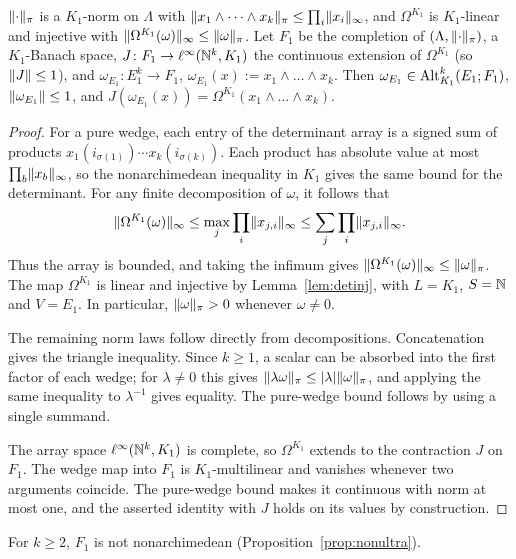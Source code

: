 \begin{lemma}\label{lem:proj}
$\lVert \cdot\rVert_\pi$ is a $K_1$\nobreakdash-norm on $\Lambda$ with $\lVert x_1\wedge\dots\wedge x_k\rVert_\pi\le\prod_i\lVert x_i\rVert_\infty$, and
$\Omega^{K_1}$ is $K_1$\nobreakdash-linear and injective with $\lVert \Omega^{K_1}(\omega)\rVert_\infty\le\lVert \omega\rVert_\pi$. Let $F_1$ be the completion of
$(\Lambda,\lVert \cdot\rVert_\pi)$, a $K_1$\nobreakdash-Banach space, $J\colon F_1\to\ell^\infty(\mathbb N^k,K_1)$ the continuous extension of $\Omega^{K_1}$ (so
$\lVert J\rVert\le1$), and $\omega_{E_1}\colon E_1^k\to F_1$, $\omega_{E_1}(x):=x_1\wedge\dots\wedge x_k$. Then $\omega_{E_1}\in\operatorname{Alt}^k_{K_1}(E_1;F_1)$,
$\lVert \omega_{E_1}\rVert\le1$, and $J(\omega_{E_1}(x))=\Omega^{K_1}(x_1\wedge\dots\wedge x_k)$.
\end{lemma}

\begin{proof}
For a pure wedge, each entry of the determinant array is a signed sum of products
$x_1(i_{\sigma(1)})\cdots x_k(i_{\sigma(k)})$. Each product has absolute value at most
$\prod_b\lVert x_b\rVert_\infty$, so the nonarchimedean inequality in $K_1$ gives the same bound for the determinant.
For any finite decomposition of $\omega$, it follows that
\[
\lVert \Omega^{K_1}(\omega)\rVert_\infty
\le\max_j\prod_i\lVert x_{j,i}\rVert_\infty
\le\sum_j\prod_i\lVert x_{j,i}\rVert_\infty.
\]
Thus the array is bounded, and taking the infimum gives
$\lVert \Omega^{K_1}(\omega)\rVert_\infty\le\lVert \omega\rVert_\pi$.
The map $\Omega^{K_1}$ is linear and injective by Lemma~\ref{lem:detinj}, with $L=K_1$, $S=\mathbb N$ and $V=E_1$.
In particular, $\lVert \omega\rVert_\pi>0$ whenever $\omega\ne0$.

The remaining norm laws follow directly from decompositions. Concatenation gives the triangle inequality.
Since $k\ge1$, a scalar can be absorbed into the first factor of each wedge; for $\lambda\ne0$ this gives
$\lVert \lambda\omega\rVert_\pi\le\lvert \lambda\rvert\lVert \omega\rVert_\pi$, and applying the same inequality to $\lambda^{-1}$ gives
equality. The pure-wedge bound follows by using a single summand.

The array space $\ell^\infty(\mathbb N^k,K_1)$ is complete, so $\Omega^{K_1}$ extends to the contraction $J$ on $F_1$.
The wedge map into $F_1$ is $K_1$\nobreakdash-multilinear and vanishes whenever two arguments coincide. The pure-wedge
bound makes it continuous with norm at most one, and the asserted identity with $J$ holds on its values by
construction.
\end{proof}

For $k\ge2$, $F_1$ is not nonarchimedean (Proposition~\ref{prop:nonultra}).

